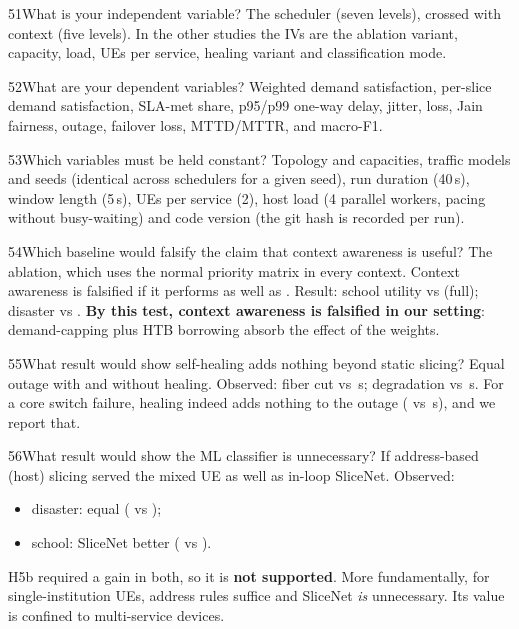 \begin{qa}{51}{What is your independent variable?}
The scheduler (seven levels), crossed with context (five levels). In the other studies the IVs are the ablation
variant, capacity, load, UEs per service, healing variant and classification mode.
\end{qa}

\begin{qa}{52}{What are your dependent variables?}
Weighted demand satisfaction, per-slice demand satisfaction, SLA-met share, p95/p99 one-way delay, jitter, loss,
Jain fairness, outage, failover loss, MTTD/MTTR, and macro-F1.
\end{qa}

\begin{qa}{53}{Which variables must be held constant?}
Topology and capacities, traffic models and seeds (identical across schedulers for a given seed), run duration (40\,s),
window length (5\,s), UEs per service (2), host load (4 parallel workers, pacing without busy-waiting) and code version
(the git hash is recorded per run).
\end{qa}

\begin{qa}{54}{Which baseline would falsify the claim that context awareness is useful?}
The  ablation, which uses the normal priority matrix in every context. Context awareness is falsified
if it performs as well as . Result: school utility \NAblSchoolNoContextUtil{} vs \NAblSchoolFullUtil{} (full);
disaster \NAblDisasterNoContextUtil{} vs \NAblDisasterFullUtil. \textbf{By this test, context awareness is falsified in our setting}:
demand-capping plus HTB borrowing absorb the effect of the weights.
\end{qa}

\begin{qa}{55}{What result would show self-healing adds nothing beyond static slicing?}
Equal outage with and without healing. Observed: fiber cut \NOutCutFullMean{} vs \NOutCutNoneMean\,s; degradation
\NOutDegFullMean{} vs \NOutDegNoneMean\,s. For a core switch failure, healing indeed adds nothing to the outage
(\NOutCoreFullMean{} vs \NOutCoreNoneMean\,s), and we report that.
\end{qa}

\begin{qa}{56}{What result would show the ML classifier is unnecessary?}
If address-based (host) slicing served the mixed UE as well as in-loop SliceNet. Observed:
\begin{itemize}
\item disaster: equal (\NMixedDisasterHostSla{} vs \NMixedDisasterSlicenetSla);
\item school: SliceNet better (\NMixedSchoolSlicenetSla{} vs \NMixedSchoolHostSla).
\end{itemize}
H5b required a gain in both, so it is \textbf{not supported}. More fundamentally, for single-institution UEs, address
rules suffice and SliceNet \emph{is} unnecessary. Its value is confined to multi-service devices.
\end{qa}

